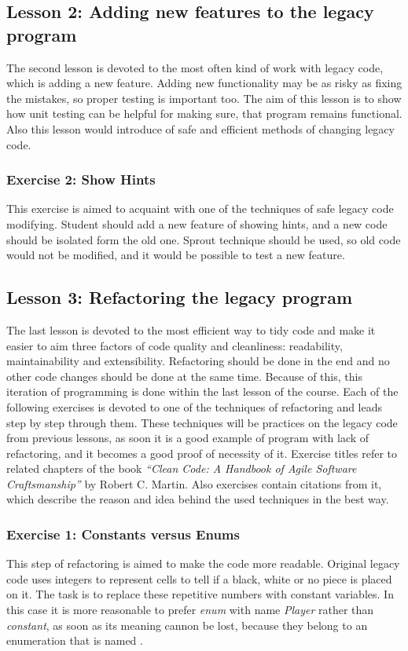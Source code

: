     
    \subsection{Lesson 2: Adding new features to the legacy program}
    The second lesson is devoted to the most often kind of work with legacy code, which is adding a new feature. Adding new functionality may be as risky as fixing the mistakes, so proper testing is important too. The aim of this lesson is to show how unit testing can be helpful for making sure, that program remains functional. Also this lesson would introduce of safe and efficient methods of changing legacy code.
    
        \subsubsection{Exercise 2: Show Hints}
        This exercise is aimed to acquaint with one of the techniques of safe legacy code modifying. Student should add a new feature of showing hints, and a new code should be isolated form the old one. Sprout technique should be used, so old code would not be modified, and it would be possible to test a new feature.
    
    \subsection{Lesson 3: Refactoring the legacy program}
    The last lesson is devoted to the most efficient way to tidy code and make it easier to aim three factors of code quality and cleanliness: readability, maintainability and extensibility. Refactoring should be done in the end and no other code changes should be done at the same time. Because of this, this iteration of programming is done within the last lesson of the course. Each of the following exercises is devoted to one of the techniques of refactoring and leads step by step through them. These techniques will be practices on the legacy code from previous lessons, as soon it is a good example of program with lack of refactoring, and it becomes a good proof of necessity of it. Exercise titles refer to related chapters of the book \textit{``Clean Code: A Handbook of Agile Software Craftsmanship''} by Robert C. Martin. Also exercises contain citations from it, which describe the reason and idea behind the used techniques in the best way.
    
    \subsubsection{Exercise 1: Constants versus Enums}
    This step of refactoring is aimed to make the code more readable. Original legacy code uses integers to represent cells to tell if a black, white or no piece is placed on it. The task is to replace these repetitive numbers with constant variables. In this case it is more reasonable to prefer \textit{enum} with name \textit{Player} rather than \textit{constant}, as soon as its meaning cannon be lost, because they belong to an enumeration that is named \cite[Constants versus Enums]{clean_code}.
    
